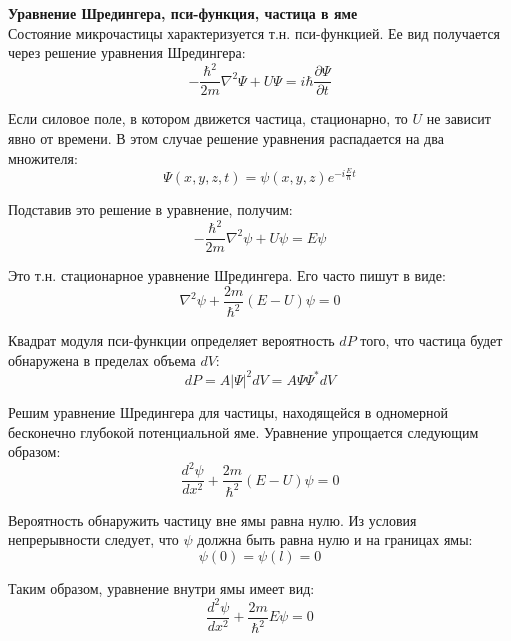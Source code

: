 \documentclass{article}
\begin{document}
	\textbf{Уравнение Шредингера, пси-функция, частица в яме}\\

	Состояние микрочастицы характеризуется т.н. пси-функцией. Ее вид получается через решение уравнения Шредингера:
	\begin{equation}
		-\frac{\hbar^2}{2m}\nabla^2\Psi + U\Psi = i\hbar\frac{\partial\Psi}{\partial t}
	\end{equation}

	Если силовое поле, в котором движется частица, стационарно, то $U$ не зависит явно от времени. В этом случае решение уравнения распадается на два множителя:
	\begin{equation}
		\Psi(x,y,z,t) = \psi(x,y,z)e^{-i\frac{E}{\hbar}t}
	\end{equation}

	Подставив это решение в уравнение, получим:
	\begin{equation}
		-\frac{\hbar^2}{2m}\nabla^2\psi + U\psi = E\psi
	\end{equation}

	Это т.н. стационарное уравнение Шредингера. Его часто пишут в виде:
	\begin{equation}
		\nabla^2\psi + \frac{2m}{\hbar^2}(E-U)\psi = 0
	\end{equation}

	Квадрат модуля пси-функции определяет вероятность $dP$ того, что частица будет обнаружена в пределах объема $dV$:
	\begin{equation}
		dP = A|\Psi|^2dV = A\Psi\Psi^*dV
	\end{equation}

	Решим уравнение Шредингера для частицы, находящейся в одномерной бесконечно глубокой потенциальной яме. Уравнение упрощается следующим образом:
	\begin{equation}
		\frac{d^2\psi}{dx^2}+\frac{2m}{\hbar^2}(E-U)\psi = 0
	\end{equation}

	Вероятность обнаружить частицу вне ямы равна нулю. Из условия непрерывности следует, что $\psi$ должна быть равна нулю и на границах ямы:
	\begin{equation}
		\psi(0) = \psi(l) = 0
	\end{equation}

	Таким образом, уравнение внутри ямы имеет вид:
	\begin{equation}
		\frac{d^2\psi}{dx^2}+\frac{2m}{\hbar^2}E\psi = 0
	\end{equation}
\end{document}
